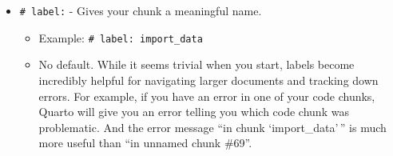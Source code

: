 \documentclass[
  letterpaper,
]{book}
\begin{document}
\begin{itemize}
\item
  \texttt{\#\textbar{}\ label:} - Gives your chunk a meaningful name.

  \begin{itemize}
  \item
    Example: \texttt{\#\textbar{}\ label:\ import\_data}
  \item
    No default. While it seems trivial when you start, labels become
    incredibly helpful for navigating larger documents and tracking down
    errors. For example, if you have an error in one of your code
    chunks, Quarto will give you an error telling you which code chunk
    was problematic. And the error message ``in chunk `import\_data'\,''
    is much more useful than ``in unnamed chunk \#69''.
  \end{itemize}
\end{itemize}
\end{document}

